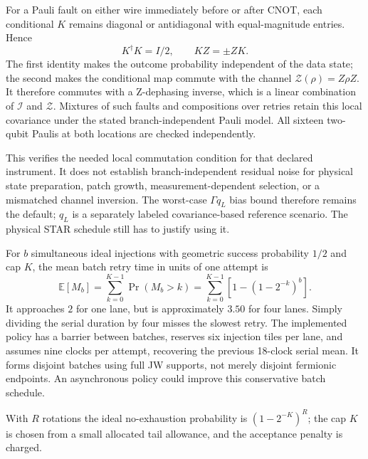 \documentclass[11pt]{article}
\begin{document}
For a Pauli fault on either wire immediately before or after CNOT, each
conditional $K$ remains diagonal or antidiagonal with equal-magnitude
entries. Hence
\begin{equation}
 K^\dagger K=I/2,\qquad KZ=\pm ZK.
\end{equation}
The first identity makes the outcome probability independent of the data
state; the second makes the conditional map commute with the channel
$\mathcal Z(\rho)=Z\rho Z$. It therefore commutes with a Z-dephasing inverse,
which is a linear combination of $\mathcal I$ and $\mathcal Z$. Mixtures
of such faults and compositions over retries retain this local covariance
under the stated branch-independent Pauli model. All sixteen two-qubit
Paulis at both locations are checked independently.

This verifies the needed local commutation condition for that declared
instrument. It does not establish branch-independent residual noise for
physical state preparation, patch growth, measurement-dependent selection,
or a mismatched channel inversion. The worst-case $\Gamma q_L$ bias bound
therefore remains the default; $q_L$ is a separately labeled covariance-based
reference scenario. The physical STAR schedule still has to justify using it.

For $b$ simultaneous ideal injections with geometric success probability
$1/2$ and cap $K$, the mean batch retry time in units of one attempt is
\begin{equation}
 \mathbb E[M_b]=\sum_{k=0}^{K-1}\Pr(M_b>k)
 =\sum_{k=0}^{K-1}\left[1-(1-2^{-k})^b\right].
\end{equation}
It approaches $2$ for one lane, but is approximately $3.50$ for four lanes.
Simply dividing the serial duration by four misses the slowest retry. The
implemented policy has a barrier between batches, reserves six injection
tiles per lane, and assumes nine clocks per attempt, recovering the previous
18-clock serial mean. It forms disjoint batches using full JW supports,
not merely disjoint fermionic endpoints. An asynchronous policy could improve
this conservative batch schedule.

With $R$ rotations the ideal no-exhaustion probability is
$(1-2^{-K})^R$; the cap $K$ is chosen from a small allocated tail allowance, and
the acceptance penalty is charged.
\end{document}
